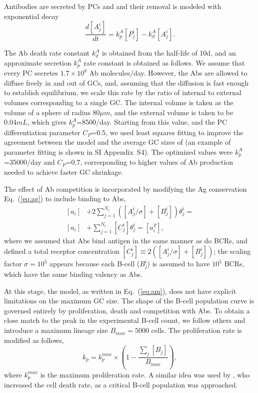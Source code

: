 \documentclass[utf8]{frontiersHLTH}%
\newcommand{\td}[2]{\frac{d {#1}}{d {#2}}}
\newcommand{\eq}[1] {Eq.~(\ref{eq:#1})}
\newcommand{\SI}{SI Appendix}
\begin{document}
Antibodies are secreted by PCs and and their removal is modeled with exponential decay
\begin{equation}
 \td{[A^i_j]}{t} = k_p^A[P^i_j] - k^A_d [A^i_j].
 \label{eq:abs}
\end{equation}

The Ab death rate constant $k^A_d$ is obtained from the half-life of 10d,\cite{zhang13} and an approximate
secretion $k_p^A$ rate constant is obtained as follows. We assume that every PC
secretes $1.7\times10^8$ Ab molecules/day\cite{leanderson92}. However,
the Abs are allowed to diffuse freely in and out of GCs, and, assuming
that the diffusion is fast enough to establish equilibrium, we scale this rate by the ratio of
internal to external volumes corresponding to a single GC. The internal
volume is taken as the volume of a sphere of radius 80$\mu
m$,\cite{wittenbrink11}
and the external
volume is taken to be $0.04mL$\cite{zhang13}, which gives
$k_p^A$=8500/day. Starting from this value, and the PC
differentiation parameter $C_P$=0.5, we used least squares fitting to
improve the agreement between the model and the average GC sizes of
\citet{wittenbrink11} (an example of parameter fitting is shown in \SI~S4). The optimized values were
$k_p^A$=35000/day and $C_P$=0.7, corresponding to higher values of Ab
production needed to achieve faster GC shrinkage.

The effect of Ab competition is incorporated by modifying the Ag conservation \eq{ag} to include binding to Abs,
\begin{equation}
 \begin{aligned}
 [a_i] &+ 2\sum^{N_\epsilon}_{j=1} ([A^i_j/\sigma]+[B^i_j])\theta^i_j=\\
 [a_i] &+\sum^{N_\epsilon}_{j=1} [C^i_j]\theta^i_j=[a^T_i],
 \end{aligned}
 \label{eq:ag2}
\end{equation}
where we assumed that Abs bind antigen in the same manner as do BCRs, and defined a total receptor concentration
$[C_j^i]\equiv 2([A^i_j/\sigma]+[B^i_j])$;
the scaling factor $\sigma=10^5$ appears because each B-cell ($B^i_j$) is assumed to have $10^5$ BCRs,\cite{casten88}
which have the same binding valency as Abs.

At this stage, the model, as written in \eq{am}, does not have explicit
limitations on the maximum GC size. The shape of the B-cell population
curve is governed entirely by proliferation, death and competition with
Abs. To obtain a close match to the peak in the experimental B-cell
count,\cite{wittenbrink11} we follow others
\cite{oprea97,rundell98} and introduce a maximum lineage size $B_{max}=5000$ cells.
The proliferation rate is modified as follows,
\begin{equation}
 k_p=k_p^{max}\times\left(1-\frac{\sum_j [B_j]}{B_{max}}\right),
 \label{eq:kprof}
\end{equation}
where $k_p^{max}$ is the maximum proliferation rate. A similar idea was
used by \citet{amitai20}, who increased the cell death rate, as a
critical B-cell population was approached.
\end{document}
